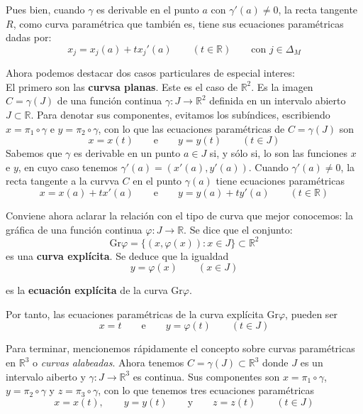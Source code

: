 \documentclass[a4paper, 12pt]{article}
\begin{document}
\begin{enumerate}[label=\textbf{\arabic*}.]
\begin{enumerate}
Pues bien, cuando \(\gamma\) es derivable en el punto \(a\) con \(\gamma' (a) \neq 0\), la recta tangente \(R\), como curva paramétrica que también es, tiene sus ecuaciones paramétricas dadas por:
\[
	x_j = x_j(a) + t x_j' (a) \qquad (t \in \mathbb{R}) \qquad \text{con } j \in \Delta_M
\]

\medskip

Ahora podemos destacar dos casos particulares de especial interes: \\

El primero son las \textbf{curvsa planas}. Este es el caso de \(\mathbb{R}^2\). Es la imagen \(C = \gamma (J)\) de una función continua \(\gamma: J \to \mathbb{R}^2\) definida en un intervalo abierto \(J \subset \mathbb{R}\). Para denotar sus componentes, evitamos los subíndices, escribiendo \(x = \pi_1 \circ \gamma\) e \(y = \pi_2 \circ \gamma\), con lo que las ecuaciones paramétricas de \(C = \gamma (J)\) son
\[
	x = x(t) \qquad \text{e} \qquad y = y(t) \qquad (t \in J)
\]
Sabemos que \(\gamma\) es derivable en un punto \(a \in J\) si, y sólo si, lo son las funciones \(x\) e \(y\), en cuyo caso tenemos \(\gamma '(a) = (x'(a), y'(a))\). Cuando \(\gamma'(a) \neq 0\), la recta tangente a la curvva \(C\) en el punto \(\gamma(a)\) tiene ecuaciones paramétricas
\[
	x = x(a)  + t x'(a) \qquad \text{e} \qquad y = y(a) + t y'(a) \qquad (t \in \mathbb{R})
\] 

Conviene ahora aclarar la relación con el tipo de curva que mejor conocemos: la gráfica de una función continua \(\varphi: J \to \mathbb{R}\). Se dice que el conjunto:
\[
	\text{Gr} \varphi = \{ (x, \varphi (x)) : x \in J \} \subset \mathbb{R}^2
\]
es una \textbf{curva explícita}. Se deduce que la igualdad
\[
	y = \varphi (x) \qquad (x \in J)
\]

es la \textbf{ecuación explícita} de la curva Gr\(\varphi\).

Por tanto, las ecuaciones paramétricas de la curva explícita Gr\(\varphi\), pueden ser
\[
	x = t \qquad \text{e} \qquad y = \varphi (t) \qquad (t \in J)
\]

\medskip

Para terminar, mencionemos rápidamente el concepto sobre curvas paramétricas en \(\mathbb{R}^3\) o \textit{curvas alabeadas}. Ahora tenemos \(C = \gamma(J) \subset \mathbb{R}^3\) donde \(J\) es un intervalo aiberto y \(\gamma: J \to \mathbb{R}^3\) es continua. Sus componentes son \(x = \pi_1 \circ \gamma\), \(y = \pi_2 \circ \gamma\) y \(z = \pi_3 \circ \gamma\), con lo que tenemos tres ecuaciones paramétricas
\[
	x = x(t), \qquad y = y(t) \qquad \text{y} \qquad z = z(t) \qquad (t \in J)
\]


\end{enumerate}
\end{enumerate}
\end{document}
